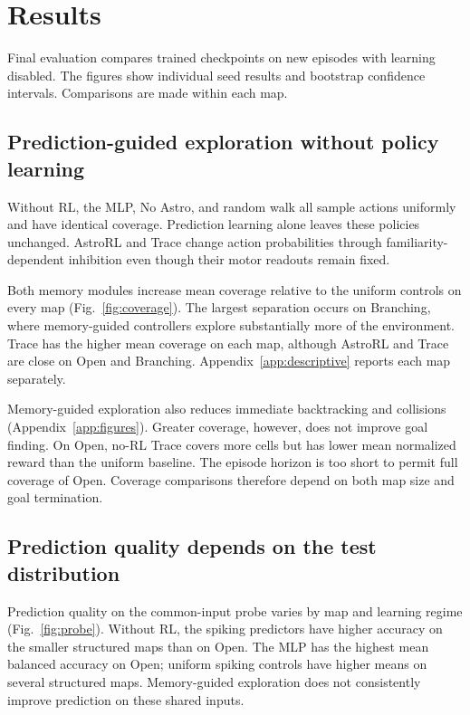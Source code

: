\section{Results}
Final evaluation compares trained checkpoints on new episodes with learning disabled. The figures show individual seed results and bootstrap confidence intervals. Comparisons are made within each map.

\subsection{Prediction-guided exploration without policy learning}
Without RL, the MLP, No Astro, and random walk all sample actions uniformly and have identical coverage. Prediction learning alone leaves these policies unchanged. AstroRL and Trace change action probabilities through familiarity-dependent inhibition even though their motor readouts remain fixed.

Both memory modules increase mean coverage relative to the uniform controls on every map (Fig.~\ref{fig:coverage}). The largest separation occurs on Branching, where memory-guided controllers explore substantially more of the environment. Trace has the higher mean coverage on each map, although AstroRL and Trace are close on Open and Branching. Appendix~\ref{app:descriptive} reports each map separately.

Memory-guided exploration also reduces immediate backtracking and collisions (Appendix~\ref{app:figures}). Greater coverage, however, does not improve goal finding. On Open, no-RL Trace covers more cells but has lower mean normalized reward than the uniform baseline. The episode horizon is too short to permit full coverage of Open. Coverage comparisons therefore depend on both map size and goal termination.



\subsection{Prediction quality depends on the test distribution}
Prediction quality on the common-input probe varies by map and learning regime (Fig.~\ref{fig:probe}). Without RL, the spiking predictors have higher accuracy on the smaller structured maps than on Open. The MLP has the highest mean balanced accuracy on Open; uniform spiking controls have higher means on several structured maps. Memory-guided exploration does not consistently improve prediction on these shared inputs.

